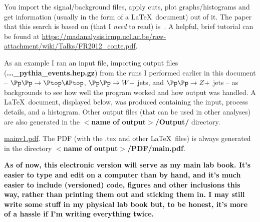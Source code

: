 You import the signal/background files, apply cuts, plot graphs/histograms and get information (usually in the form of a \LaTeX\ document) out of it. The paper that this search is based on (that I \emph{need} to read) is~\cite{ATLAS-CONF-2016-019}. A helpful, brief tutorial can be found at \url{https://madanalysis.irmp.ucl.ac.be/raw-attachment/wiki/Talks/FR2012_conte.pdf}.

As an example I ran an input file, importing \madgraph output files (\textbf{...\_pythia\_events.hep.gz}) from the runs I performed earlier in this document -- $\Pp\Pp \rightarrow \ttbar$, $\Pp\Pp \rightarrow W +$ jets, and $\Pp\Pp \rightarrow Z +$ jets -- as backgrounds to see how well the program worked and how output was handled. A \LaTeX\ document, displayed below, was produced containing the input, process details, and a histogram. Other output files (that can be used in other analyses) are also generated in the \textbf{$<$name of output$>$/Output/} directory.

\href{run:sec13/mainv1.pdf}{mainv1.pdf}. The PDF (with the .tex and other \LaTeX\ files) is always generated in the directory \textbf{$<$name of output$>$/PDF/main.pdf}.

\textbf{As of now, this electronic version will serve as my main lab book. It's easier to type and edit on a computer than by hand, and it's much easier to include (versioned) code, figures and other inclusions this way, rather than printing them out and sticking them in. I may still write some stuff in my physical lab book but, to be honest, it's more of a hassle if I'm writing everything twice.}
